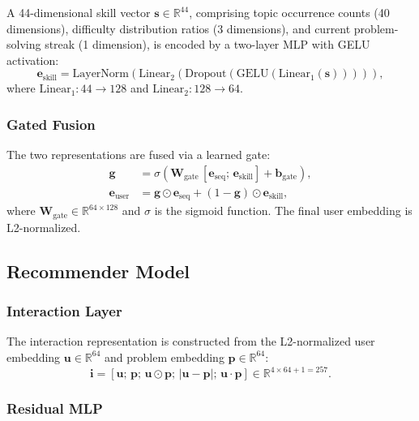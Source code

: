 \documentclass[12pt]{article}
\begin{document}
A 44-dimensional skill vector $\mathbf{s} \in \mathbb{R}^{44}$, comprising topic occurrence counts (40 dimensions), difficulty distribution ratios (3 dimensions), and current problem-solving streak (1 dimension), is encoded by a two-layer MLP with GELU activation:
\begin{equation}
\mathbf{e}_{\text{skill}} = \text{LayerNorm}(\text{Linear}_2(\text{Dropout}(\text{GELU}(\text{Linear}_1(\mathbf{s}))))),
\end{equation}
where $\text{Linear}_1: 44 \to 128$ and $\text{Linear}_2: 128 \to 64$.

\subsubsection{Gated Fusion}

The two representations are fused via a learned gate:
\begin{align}
\mathbf{g} &= \sigma\!\left(\mathbf{W}_{\text{gate}}\,[\mathbf{e}_{\text{seq}};\, \mathbf{e}_{\text{skill}}] + \mathbf{b}_{\text{gate}}\right), \\
\mathbf{e}_{\text{user}} &= \mathbf{g} \odot \mathbf{e}_{\text{seq}} + (1 - \mathbf{g}) \odot \mathbf{e}_{\text{skill}},
\end{align}
where $\mathbf{W}_{\text{gate}} \in \mathbb{R}^{64 \times 128}$ and $\sigma$ is the sigmoid function. The final user embedding is L2-normalized.

\subsection{Recommender Model}

\subsubsection{Interaction Layer}

The interaction representation is constructed from the L2-normalized user embedding $\mathbf{u} \in \mathbb{R}^{64}$ and problem embedding $\mathbf{p} \in \mathbb{R}^{64}$:
\begin{equation}
\mathbf{i} = [\mathbf{u};\, \mathbf{p};\, \mathbf{u} \odot \mathbf{p};\, |\mathbf{u} - \mathbf{p}|;\, \mathbf{u} \cdot \mathbf{p}] \in \mathbb{R}^{4 \times 64 + 1 = 257}.
\end{equation}

\subsubsection{Residual MLP}
\end{document}
